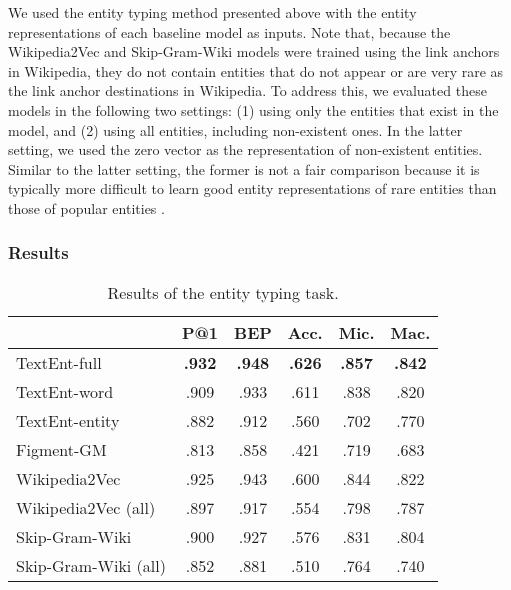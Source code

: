 \documentclass[11pt]{article}
\begin{document}
  We used the entity typing method presented above with the entity representations of each baseline model as inputs.
  Note that, because the Wikipedia2Vec and Skip-Gram-Wiki models were trained using the link anchors in Wikipedia, they do not contain entities that do not appear or are very rare as the link anchor destinations in Wikipedia.
  To address this, we evaluated these models in the following two settings:
  (1) using only the entities that exist in the model, and
  (2) using all entities, including non-existent ones.
  In the latter setting,  we used the zero vector as the representation of non-existent entities.
  Similar to the latter setting, the former is not a fair comparison because it is typically more difficult to learn good entity representations of rare entities than those of popular entities \cite{yaghoobzadeh-schutze:2015:EMNLP}.

  \subsubsection*{Results}

  \begin{table}[t]
    \centering
    \begin{tabular}{l|cc|ccc}
                              & P@1           & BEP           & Acc.          & Mic.          & Mac.         \\
      \hline
      TextEnt-full            & \textbf{.932} & \textbf{.948} & \textbf{.626} & \textbf{.857} & \textbf{.842}\\
TextEnt-word            & .909          & .933          & .611          & .838          & .820         \\
TextEnt-entity          & .882          & .912          & .560          & .702          & .770         \\
\hline
      Figment-GM              & .813          & .858          & .421          & .719          & .683         \\
      Wikipedia2Vec           & .925          & .943          & .600          & .844          & .822         \\
      Wikipedia2Vec (all)     & .897          & .917          & .554          & .798          & .787         \\
      Skip-Gram-Wiki          & .900          & .927          & .576          & .831          & .804         \\
      Skip-Gram-Wiki (all)    & .852          & .881          & .510          & .764          & .740         \\
    \end{tabular}
    \caption {Results of the entity typing task.}
    \label{tb:entity-typing-results}
  \end{table}
\end{document}
